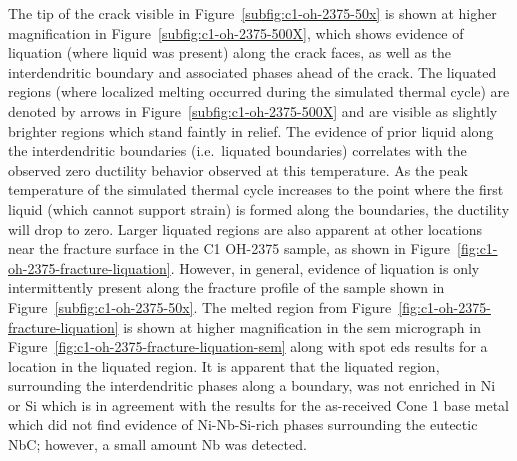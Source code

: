 {The tip of the crack visible in Figure~\ref{subfig:c1-oh-2375-50x} is shown at higher magnification in Figure~\ref{subfig:c1-oh-2375-500X}, which shows evidence of liquation (where liquid was present) along the crack faces, as well as the interdendritic boundary and associated phases ahead of the crack. The liquated regions (where localized melting occurred during the simulated thermal cycle) are denoted by arrows in Figure~\ref{subfig:c1-oh-2375-500X} and are visible as slightly brighter regions which stand faintly in relief. The evidence of prior liquid along the interdendritic boundaries (i.e.~liquated boundaries) correlates with the observed zero ductility behavior observed at this temperature. As the peak temperature of the simulated thermal cycle increases to the point where the first liquid (which cannot support strain) is formed along the boundaries, the ductility will drop to zero. Larger liquated regions are also apparent at other locations near the fracture surface in the C1 OH-2375 sample, as shown in Figure~\ref{fig:c1-oh-2375-fracture-liquation}. However, in general, evidence of liquation is only intermittently present along the fracture profile of the sample shown in Figure~\ref{subfig:c1-oh-2375-50x}. The melted region from Figure~\ref{fig:c1-oh-2375-fracture-liquation} is shown at higher magnification in the \gls{sem} micrograph in Figure~\ref{fig:c1-oh-2375-fracture-liquation-sem} along with spot \gls{eds} results for a location in the liquated region. It is apparent that the liquated region, surrounding the interdendritic phases along a boundary, was not enriched in Ni or Si which is in agreement with the results for the as-received Cone 1 base metal which did not find evidence of Ni-Nb-Si-rich phases surrounding the eutectic NbC; however, a small amount Nb was detected.

}
